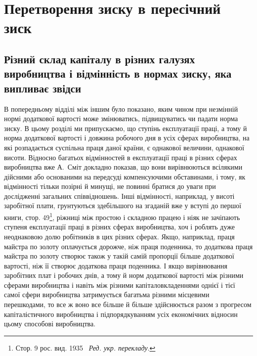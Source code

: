 
\chapter{Перетворення зиску в пересічний зиск}

\section{Різний склад капіталу в різних галузях виробництва
і відмінність в нормах зиску, яка випливає звідси}

В попередньому відділі між іншим було показано, яким чином
при незмінній нормі додаткової вартості може змінюватись, підвищуватись
чи падати норма зиску. В цьому розділі ми припускаємо,
що ступінь експлуатації праці, а тому й норма додаткової
вартості і довжина робочого дня в усіх сферах виробництва,
на які розпадається суспільна праця даної країни, є однакової величини,
однакової висоти. Відносно багатьох відмінностей в експлуатації
праці в різних сферах виробництва вже А.~Сміт докладно показав,
що вони вирівнюються всілякими дійсними або основаними на передсуді
компенсуючими обставинами, і тому, як відмінності тільки
позірні й минущі, не повинні братися до уваги при дослідженні загальних
співвідношень. Інші відмінності, наприклад, у висоті заробітної
плати, грунтуються здебільшого на згаданій вже у вступі до
першої книги, стор. 49\footnote*{Стор. 9 рос. вид. 1935~ \emph{Ред. укр. перекладу}.}, ріжниці між простою і складною працею
і ніяк не зачіпають ступеня експлуатації праці в різних сферах
виробництва, хоч і роблять дуже неоднаковою долю робітників
в цих різних сферах. Якщо, наприклад, праця майстра по золоту
оплачується дорожче, ніж праця поденника, то додаткова праця
майстра по золоту створює також у такій самій пропорції більше
додаткової вартості, ніж її створює додаткова праця поденника.
І якщо вирівнювання заробітних плат і робочих днів, а тому й
норм додаткової вартості між різними сферами виробництва
і навіть між різними капіталовкладеннями однієї і тієї самої
сфери виробництва затримується багатьма різними місцевими
перешкодами, то все ж воно все більше й більше здійснюється
разом з прогресом капіталістичного виробництва і підпорядкуванням
усіх економічних відносин цьому способові виробництва.
\parbreak{}  %
